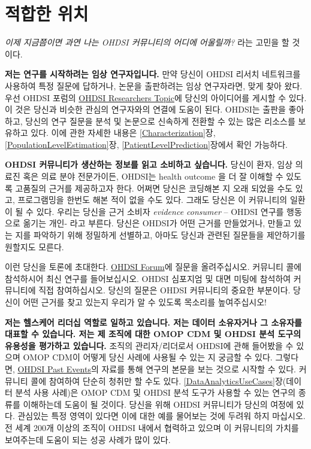 \documentclass[11pt]{book}
\theoremstyle{definition}
\theoremstyle{definition}
\theoremstyle{definition}
\theoremstyle{remark}
\begin{document}
\section{적합한 위치}\label{-}

\emph{이제 지금쯤이면 과연 나는 OHDSI 커뮤니티의 어디에 어울릴까?} 라는
고민을 할 것이다.

\textbf{저는 연구를 시작하려는 임상 연구자입니다.} 만약 당신이 OHDSI
리서치 네트워크를 사용하여 특정 질문에 답하거나, 논문을 출판하려는 임상
연구자라면, 맞게 찾아 왔다. 우선 OHDSI 포럼의
\href{https://forums.ohdsi.org/c/researchers}{OHDSI Researchers Topic}에
당신의 아이디어를 게시할 수 있다. 이 것은 당신과 비슷한 관심의
연구자와의 연결에 도움이 된다. OHDSI는 출판을 좋아하고, 당신의 연구
질문을 분석 및 논문으로 신속하게 전환할 수 있는 많은 리소스를 보유하고
있다. 이에 관한 자세한 내용은 \ref{Characterization}장,
\ref{PopulationLevelEstimation}장, \ref{PatientLevelPrediction}장에서
확인 가능하다.

\textbf{OHDSI 커뮤니티가 생산하는 정보를 읽고 소비하고 싶습니다.} 당신이
환자, 임상 의료진 혹은 의료 분야 전문가이든, OHDSI는 health outcome 을
더 잘 이해할 수 있도록 고품질의 근거를 제공하고자 한다. 어쩌면 당신은
코딩해본 지 오래 되었을 수도 있고, 프로그램밍을 한번도 해본 적이 없을
수도 있다. 그래도 당신은 이 커뮤니티의 일환이 될 수 있다. 우리는 당신을
근거 소비자 \emph{evidence consumer} -- OHDSI 연구를 행동으로 옮기는
개인- 라고 부른다. 당신은 OHDSI가 어떤 근거를 만들었거나, 만들고 있는
지를 파악하기 위해 정밀하게 선별하고, 아마도 당신과 관련된 질문들을
제안하기를 원할지도 모른다.

이런 당신을 토론에 초대한다. \href{http://forum.ohdsi.org}{OHDSI
Forum}에 질문을 올려주십시오. 커뮤니티 콜에 참석하시어 최신 연구를
들어보십시오. OHDSI 심포지엄 및 대면 미팅에 참석하여 커뮤니티에 직접
참여하십시오. 당신의 질문은 OHDSI 커뮤니티의 중요한 부분이다. 당신이
어떤 근거를 찾고 있는지 우리가 알 수 있도록 목소리를 높여주십시오!

\textbf{저는 헬스케어 리더십 역할로 일하고 있습니다. 저는 데이터
소유자거나 그 소유자를 대표할 수 있습니다. 저는 제 조직에 대한 OMOP CDM
및 OHDSI 분석 도구의 유용성을 평가하고 있습니다.} 조직의 관리자/리더로서
OHDSI에 관해 들어봤을 수 있으며 OMOP CDM이 어떻게 당신 사례에 사용될 수
있는 지 궁금할 수 있다. 그렇다면,
\href{https://www.ohdsi.org/past-events/}{OHDSI Past Events}의 자료를
통해 연구의 본문을 보는 것으로 시작할 수 있다. 커뮤니티 콜에 참여하여
단순히 청취만 할 수도 있다. \ref{DataAnalyticsUseCases}장(데이터 분석
사용 사례)은 OMOP CDM 및 OHDSI 분석 도구가 사용할 수 있는 연구의 종류를
이해하는데 도움이 될 것이다. 당신을 위해 OHDSI 커뮤니티가 당신의 여정에
있다. 관심있는 특정 영역이 있다면 이에 대한 예를 물어보는 것에 두려워
하지 마십시오. 전 세계 200개 이상의 조직이 OHDSI 내에서 협력하고 있으며
이 커뮤니티의 가치를 보여주는데 도움이 되는 성공 사례가 많이 있다.
\end{document}
